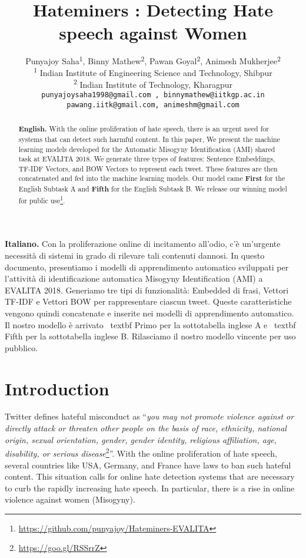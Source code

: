 \documentclass[11pt]{article}
\title{Hateminers : Detecting Hate speech against Women}
\author{Punyajoy Saha\textsuperscript{$1$}, Binny Mathew\textsuperscript{$2$},  Pawan Goyal\textsuperscript{$2$}, Animesh Mukherjee\textsuperscript{$2$}\\
	\textsuperscript{$1$} Indian Institute of Engineering Science and Technology, Shibpur\\	
	\textsuperscript{$2$} Indian Institute of Technology, Kharagpur\\
	{\tt \small punyajoysaha1998@gmail.com  , binnymathew@iitkgp.ac.in} \\
	{\tt \small pawang.iitk@gmail.com, animeshm@gmail.com}}
\date{}
\begin{document}
\maketitle
\begin{abstract}
  \textbf{English.} With the online proliferation of hate speech, there is an urgent need for systems that can detect such harmful content. In this paper, We present the machine learning models developed for the Automatic Misogyny Identification (AMI) shared task at EVALITA 2018. We generate three types of features: Sentence Embeddings, TF-IDF Vectors, and BOW Vectors to represent each tweet. These features are then concatenated and fed into the machine learning models. Our model came \textbf{First} for the English Subtask A and \textbf{Fifth} for the English Subtask B. We release our winning model for public use\footnote{\label{model_link}\url{https://github.com/punyajoy/Hateminers-EVALITA}}.
\end{abstract}

\begin{abstract-alt}
 \textrm{\bf{Italiano.}} Con la proliferazione online di incitamento all'odio, c'è un'urgente necessità di sistemi in grado di rilevare tali contenuti dannosi. In questo documento, presentiamo i modelli di apprendimento automatico sviluppati per l'attività di identificazione automatica Misogyny Identification (AMI) a EVALITA 2018. Generiamo tre tipi di funzionalità: Embedded di frasi, Vettori TF-IDF e Vettori BOW per rappresentare ciascun tweet. Queste caratteristiche vengono quindi concatenate e inserite nei modelli di apprendimento automatico. Il nostro modello è arrivato \ textbf {Primo} per la sottotabella inglese A e \ textbf {Fifth} per la sottotabella inglese B. Rilasciamo il nostro modello vincente per uso pubblico.
\end{abstract-alt}


\section{Introduction}
 Twitter defines hateful misconduct as ``\textit{you may not promote violence against or directly attack or threaten other people on the basis of race, ethnicity, national origin, sexual orientation, gender, gender identity, religious affiliation, age, disability, or serious disease}\footnote{\url{https://goo.gl/RSSrrZ}}''. With the online proliferation of hate speech, several countries like USA, Germany, and France have laws to ban such hateful content. This situation calls for online hate detection systems that are necessary to curb the rapidly increasing hate speech. In particular, there is a rise in online violence against women (Misogyny).
\end{document}
